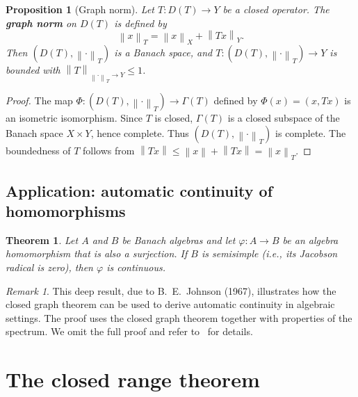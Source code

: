 \documentclass[a4paper,12pt]{book}
\newcommand{\norm}[1]{\left\| #1 \right\|}
\theoremstyle{definition}
\theoremstyle{plain}
\newtheorem{theorem}[definition]{Theorem}
\newtheorem{proposition}[definition]{Proposition}
\theoremstyle{remark}
\newtheorem{remark}[definition]{Remark}
\begin{document}
\begin{proposition}[Graph norm]\label{prop:graph-norm}
Let $T \colon D(T) \to Y$ be a closed operator. The \textbf{graph norm} on $D(T)$
is defined by
\[
  \norm{x}_T = \norm{x}_X + \norm{Tx}_Y.
\]
Then $(D(T), \norm{\cdot}_T)$ is a Banach space, and $T \colon (D(T), \norm{\cdot}_T)
\to Y$ is bounded with $\norm{T}_{\norm{\cdot}_T \to Y} \leq 1$.
\end{proposition}

\begin{proof}
The map $\Phi \colon (D(T), \norm{\cdot}_T) \to \Gamma(T)$ defined by
$\Phi(x) = (x, Tx)$ is an isometric isomorphism. Since $T$ is closed, $\Gamma(T)$
is a closed subspace of the Banach space $X \times Y$, hence complete. Thus
$(D(T), \norm{\cdot}_T)$ is complete. The boundedness of $T$ follows from
$\norm{Tx} \leq \norm{x} + \norm{Tx} = \norm{x}_T$.
\end{proof}

\subsection{Application: automatic continuity of homomorphisms}

\begin{theorem}\label{thm:auto-cont-algebra}
Let $A$ and $B$ be Banach algebras and let
$\varphi \colon A \to B$ be an algebra homomorphism that is also a surjection.
If $B$ is semisimple (i.e., its Jacobson
radical is zero), then $\varphi$ is continuous.
\end{theorem}

\begin{remark}
This deep result, due to B.~E.~Johnson (1967), illustrates
how the closed graph theorem can be used to derive automatic continuity in algebraic
settings. The proof uses the closed graph theorem together with properties of the
spectrum. We omit the full proof and refer to~\cite{dales2000} for details.
\end{remark}

\section{The closed range theorem}\label{sec:closed-range}
\end{document}

